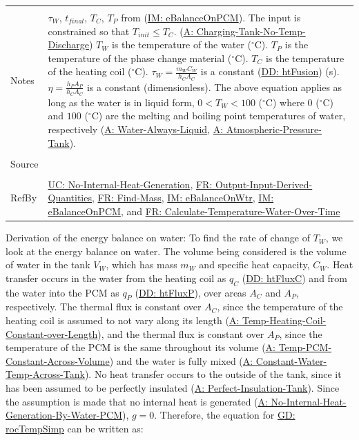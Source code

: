 \documentclass[12pt]{article}
\begin{document}
\begin{minipage}{\textwidth}
\begin{tabular}{p{} p{}}
\\ \midrule \\
Notes & ${τ_{W}}$, ${t_{final}}$, ${T_{C}}$, ${T_{P}}$ from (\hyperref[IM:eBalanceOnPCM]{IM: eBalanceOnPCM}). The input is constrained so that ${T_{init}}\leq{}{T_{C}}$. (\hyperref[assumpCTNOD]{A: Charging-Tank-No-Temp-Discharge}) ${T_{W}}$ is the temperature of the water (${}^{\circ}$C). ${T_{P}}$ is the temperature of the phase change material (${}^{\circ}$C). ${T_{C}}$ is the temperature of the heating coil (${}^{\circ}$C). ${τ_{W}}=\frac{{m_{W}} {C_{W}}}{{h_{C}} {A_{C}}}$ is a constant (\hyperref[DD:htFusion]{DD: htFusion}) (s). $η=\frac{{h_{P}} {A_{P}}}{{h_{C}} {A_{C}}}$ is a constant (dimensionless). The above equation applies as long as the water is in liquid form, $0<{T_{W}}<100$ (${}^{\circ}$C) where $0$ (${}^{\circ}$C) and $100$ (${}^{\circ}$C) are the melting and boiling point temperatures of water, respectively (\hyperref[assumpWAL]{A: Water-Always-Liquid}, \hyperref[assumpAPT]{A: Atmospheric-Pressure-Tank}).
\\ \midrule \\
Source & \cite{koothoor2013}
\\ \midrule \\
RefBy & \hyperref[unlikeChgNIHG]{UC: No-Internal-Heat-Generation}, \hyperref[outputInputDerivQuants]{FR: Output-Input-Derived-Quantities}, \hyperref[findMass]{FR: Find-Mass}, \hyperref[IM:eBalanceOnWtr]{IM: eBalanceOnWtr}, \hyperref[IM:eBalanceOnPCM]{IM: eBalanceOnPCM}, and \hyperref[calcTempWtrOverTime]{FR: Calculate-Temperature-Water-Over-Time}
\\ \bottomrule \end{tabular}
\end{minipage}
Derivation of the energy balance on water:
To find the rate of change of ${T_{W}}$, we look at the energy balance on water. The volume being considered is the volume of water in the tank ${V_{W}}$, which has mass ${m_{W}}$ and specific heat capacity, ${C_{W}}$. Heat transfer occurs in the water from the heating coil as ${q_{C}}$ (\hyperref[DD:htFluxC]{DD: htFluxC})  and from the water into the PCM as ${q_{P}}$ (\hyperref[DD:htFluxP]{DD: htFluxP}), over areas ${A_{C}}$ and ${A_{P}}$, respectively. The thermal flux is constant over ${A_{C}}$, since the temperature of the heating coil is assumed to not vary along its length (\hyperref[assumpTHCCoL]{A: Temp-Heating-Coil-Constant-over-Length}), and the thermal flux is constant over ${A_{P}}$, since the temperature of the PCM is the same throughout its volume (\hyperref[assumpTPCAV]{A: Temp-PCM-Constant-Across-Volume}) and the water is fully mixed (\hyperref[assumpCWTAT]{A: Constant-Water-Temp-Across-Tank}). No heat transfer occurs to the outside of the tank, since it has been assumed to be perfectly insulated (\hyperref[assumpPIT]{A: Perfect-Insulation-Tank}). Since the assumption is made that no internal heat is generated (\hyperref[assumpNIHGBWP]{A: No-Internal-Heat-Generation-By-Water-PCM}), $g=0$. Therefore, the equation for \hyperref[GD:rocTempSimp]{GD: rocTempSimp} can be written as:
\end{document}
